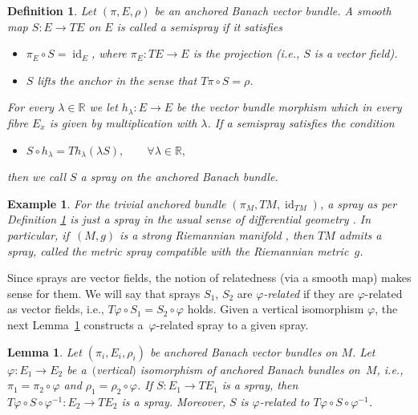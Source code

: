 \documentclass[pdftex]{sigma}
\numberwithin{equation}{section}
\newtheorem{Lemma}[Theorem]{Lemma}
\newtheorem{Definition}[Theorem]{Definition}
\newtheorem{Example}[Theorem]{Example}
\newcommand{\R}{\ensuremath{\mathbb{R}}}
\DeclareMathOperator{\id}{id}
\begin{document}
\begin{Definition}\label{defn:spray}
Let $(\pi, E, \rho)$ be an anchored Banach vector bundle.
A smooth map $S\colon E \rightarrow TE$ on $E$ is called a \emph{semispray} if it satisfies
\begin{itemize}\itemsep=0pt
\item[\hypertarget{sprayS1}{(S1)}] $\pi_{E} \circ S = \id_E$, where $\pi_E \colon TE\rightarrow E$ is the projection (i.e., $S$ is a vector field).
\item[\hypertarget{sprayS2}{(S2)}] $S$ \emph{lifts the anchor} in the sense that $T\pi \circ S = \rho$.
\end{itemize}
For every $\lambda \in \R$ we let $h_\lambda \colon E \rightarrow E$ be the vector bundle morphism which in every fibre $E_x$ is given by multiplication with $\lambda$.
If a semispray satisfies the condition
\begin{itemize}\itemsep=0pt
\item[\hypertarget{sprayS3}{(S3)}] $S\circ h_\lambda = Th_\lambda (\lambda S), \qquad \forall \lambda \in \R,$
\end{itemize}
then we call $S$ a \emph{spray} on the anchored Banach bundle.
\end{Definition}

\begin{Example}
For the trivial anchored bundle $(\pi_M, TM,\id_{TM})$, a spray as per Definition \ref{defn:spray} is just a spray in the usual sense of differential geometry \cite[Chapter~IV, Section~3]{La01}.
In particular, if~$(M,g)$ is a strong Riemannian manifold \cite[Section~4]{Sch23}, then $TM$ admits a spray, called the \emph{metric spray} compatible with the Riemannian metric~$g$.
\end{Example}

Since sprays are vector fields, the notion of relatedness (via a smooth map) makes sense for them. We will say that sprays $S_1$, $S_2$ are $\varphi$\emph{-related} if they are $\varphi$-related as vector fields, i.e., $T\varphi \circ S_1 = S_2 \circ \varphi$ holds.
Given a vertical isomorphism $\varphi$, the next Lemma~\ref{lem:anchoredIso} constructs a~$\varphi$-related spray to a given spray.

\begin{Lemma}\label{lem:anchoredIso}
 Let $(\pi_{i},E_{i},\rho_{i})$ be anchored Banach vector bundles on $M$.
 Let $\varphi \colon E_{1} \rightarrow E_{2}$ be a~$($vertical$)$ isomorphism of anchored Banach bundles on~$M$, i.e., $\pi_{1} = \pi_{2}\circ \varphi$ and $\rho_{1} = \rho_{2} \circ \varphi$.
 If $S\colon E_{1} \rightarrow TE_{1}$ is a spray, then $T\varphi \circ S \circ \varphi^{-1}\colon E_{2} \rightarrow TE_{2}$ is a spray.
 Moreover, $S$ is $\varphi$-related to $T \varphi \circ S \circ \varphi^{-1}$.
\end{Lemma}
\end{document}

